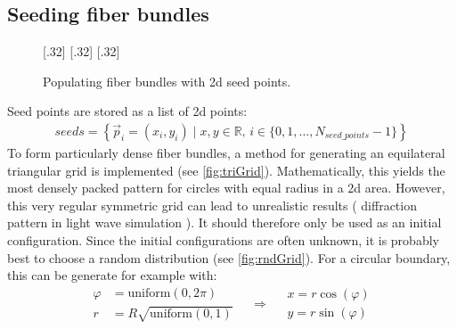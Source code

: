 \subsection{Seeding fiber bundles}\label{sec:seeds}
%
\begin{figure}[!t]
    \def\tikzheight{0.25\textwidth}
    \centering
    [.32\textwidth]{
    }
    \hfill
    [.32\textwidth]{
    }
    \hfill
    [.32\textwidth]{
    }
	\caption{Populating fiber bundles with 2d seed points.}
\end{figure}
%
Seed points are stored as a list of 2d points:
\begin{align}
\mathit{seeds} = \left\{ \vec{p}_i=(x_i,y_i) \mid x,y \in \mathbb{R} , \, i \in \{0,1,...,N_{\mathit{seed\_points}}-1\}\right\}
\end{align}
%
To form particularly dense fiber bundles, a method for generating an equilateral triangular grid is implemented (see \ref{fig:triGrid}).
Mathematically, this yields the most densely packed pattern for circles with equal radius in a 2d area.
However, this very regular symmetric grid can lead to unrealistic results (\eg{} diffraction pattern in light wave simulation \cite{MenzelDissertation}).
It should therefore only be used as an initial configuration.
Since the initial configurations are often unknown, it is probably best to choose a random distribution (see \cref{fig:rndGrid}).
For a circular boundary, this can be generate for example with:
% 
\begin{equation}
\begin{split}
\varphi &= \mathrm{uniform}(0,2 \pi) \\
r &= R \sqrt{\mathrm{uniform}(0,1)}
\end{split}
\quad\Rightarrow\quad
\begin{split}
x = r \cos(\varphi)\\
y = r \sin(\varphi)
\end{split}
\end{equation}
%
%
%
